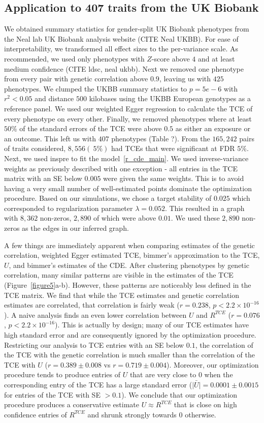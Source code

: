 \documentclass{article}
\begin{document}
\subsection{Application to 407 traits from the UK Biobank}
We obtained summary statistics for gender-split UK Biobank phenotypes from
the Neal lab UK Biobank analysis website (CITE Neal UKBB). For ease of interpretability,
we transformed all effect sizes to the per-variance scale. As  recommended,
we used only phenotypes with $Z$-score above $4$ and at least medium confidence
(CITE ldsc, neal ukbb). Next we removed one phenotype from every pair with genetic
correlation above $0.9$, leaving us with $425$ phenotypes. We clumped the UKBB
summary statistics to $p=5e-6$ with $r^2 < 0.05$ and distance $500$ kilobases using
the UKBB European genotypes as a reference panel. We used our weighted Egger regression
to calculate the TCE of every phenotype on every other. Finally, we removed
phenotypes where at least $50\%$ of the standard errors of the TCE were above $0.5$
as either an exposure or an outcome. This left us with $407$ phenotypes (Table ?).
From the $165,242$ pairs of traits considered, $8,556 (~5\%)$ had TCEs that
were significant at FDR $5\%$.
Next, we used inspre to fit the model~\ref{r_cde_main}. We used inverse-variance weights
as previously described with one exception - all entries in the TCE matrix with
an SE below $0.005$ were given the same weights. This is to avoid having a very small
number of well-estimated points dominate the optimization procedure. Based on our simulations,
we chose a target stability of $0.025$ which corresponded to regularization 
parameter $\lambda = 0.052$. This resulted in a graph with $8,362$ non-zeros,
$2,890$ of which were above $0.01$. We used these $2,890$ non-zeros as the edges
in our inferred graph.

A few things are immediately apparent when comparing estimates of the
genetic correlation, weighted Egger estimated TCE, bimmer's
approximation to the TCE, $U$, and bimmer's estimates of the CDE. After clustering
phenotypes by genetic correlation, many similar patterns are visible in the
estimates of the TCE (Figure~\ref{figure5}a-b). However, these patterns are
noticeably less defined in the TCE matrix. We find that while the TCE estimates
and genetic correlation estimates are correlated, that correlation is fairly
weak ($r = 0.238$, $p < 2.2\times 10^{-16}$). A naive analysis
finds an even lower correlation between $U$ and $R^{TCE}$ ($r = 0.076$, $p < 2.2\times 10^{-16}$).
This is actually by design; many of our TCE estimates have high standard error and are consequently
ignored by the optimization procedure. Restricting our analysis to TCE entries with an
SE below $0.1$, the correlation of the TCE with the genetic correlation is much smaller
than the correlation of the TCE with $U$ ($r = 0.389 \pm 0.008$ vs $r = 0.719 \pm 0.004$).
Moreover, our optimization
procedure tends to produce entries of $U$ that are very close to $0$ when the corresponding
entry of the TCE has a large standard error ($\bar{|U|} = 0.0001 \pm 0.0015$ for entries of
the TCE with SE $> 0.1$). We conclude that our optimization procedure produces a conservative
estimate $U \approx R^{TCE}$ that is close on high confidence entries of $R^{TCE}$ and
shrunk strongly towards 0 otherwise.
\end{document}
